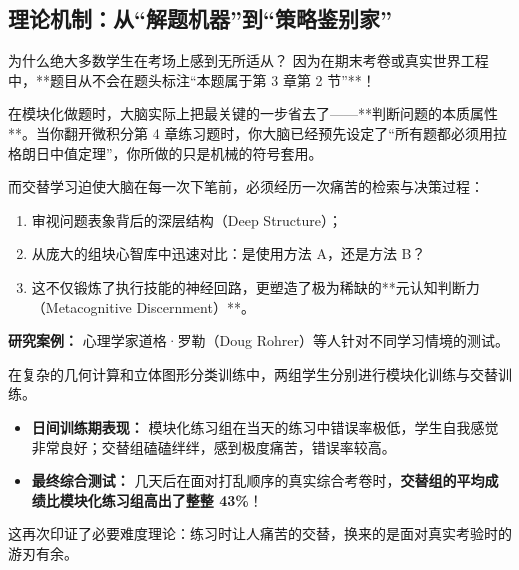 \documentclass[12pt,a4paper,openany]{ctexbook}
\begin{document}
\subsection*{理论机制：从“解题机器”到“策略鉴别家”}

为什么绝大多数学生在考场上感到无所适从？
因为在期末考卷或真实世界工程中，**题目从不会在题头标注“本题属于第 3 章第 2 节”**！

在模块化做题时，大脑实际上把最关键的一步省去了——**判断问题的本质属性**。当你翻开微积分第 4 章练习题时，你大脑已经预先设定了“所有题都必须用拉格朗日中值定理”，你所做的只是机械的符号套用。

而交替学习迫使大脑在每一次下笔前，必须经历一次痛苦的检索与决策过程：
\begin{enumerate}
    \item 审视问题表象背后的深层结构（Deep Structure）；
    \item 从庞大的组块心智库中迅速对比：是使用方法 A，还是方法 B？
    \item 这不仅锻炼了执行技能的神经回路，更塑造了极为稀缺的**元认知判断力（Metacognitive Discernment）**。
\end{enumerate}

\begin{casebox}[运动与学术领域的交替练习实验]
\textbf{研究案例：} 心理学家道格·罗勒（Doug Rohrer）等人针对不同学习情境的测试。

在复杂的几何计算和立体图形分类训练中，两组学生分别进行模块化训练与交替训练。
\begin{itemize}
    \item \textbf{日间训练期表现：} 模块化练习组在当天的练习中错误率极低，学生自我感觉非常良好；交替组磕磕绊绊，感到极度痛苦，错误率较高。
    \item \textbf{最终综合测试：} 几天后在面对打乱顺序的真实综合考卷时，\textbf{交替组的平均成绩比模块化练习组高出了整整 43\%}！
\end{itemize}
这再次印证了必要难度理论：练习时让人痛苦的交替，换来的是面对真实考验时的游刃有余。
\end{casebox}
\end{document}
